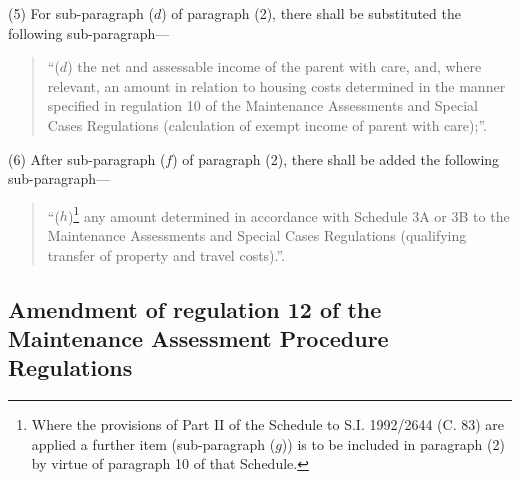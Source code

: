 \documentclass[12pt,a4paper]{article}
\begin{document}
(5) For sub-paragraph ($d$) of paragraph (2), there shall be substituted the following sub-paragraph—
\begin{quotation}
“($d$) the net and assessable income of the parent with care, and, where relevant, an amount in relation to housing costs determined in the manner specified in regulation 10 of the Maintenance Assessments and Special Cases Regulations (calculation of exempt income of parent with care);”.
\end{quotation}

(6) After sub-paragraph ($f$) of paragraph (2), there shall be added the following sub-paragraph—
\begin{quotation}
“($h$)\footnote{\frenchspacing Where the provisions of Part II of the Schedule to S.I. 1992/2644 (C. 83) are applied a further item (sub-paragraph ($g$)) is to be included in paragraph (2) by virtue of paragraph 10 of that Schedule.} any amount determined in accordance with Schedule 3A or 3B to the Maintenance Assessments and Special Cases Regulations (qualifying transfer of property and travel costs).”.
\end{quotation}

\subsection[19. Amendment of regulation 12 of the Maintenance Assessment Procedure Regulations]{Amendment of regulation 12 of the Maintenance Assessment Procedure Regulations}
\end{document}
